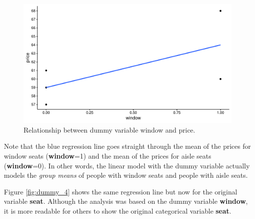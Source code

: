 \documentclass[]{book}\usepackage[]{graphicx}\usepackage[]{color}
\makeatletter
\def\maxwidth{ %
  \ifdim\Gin@nat@width>\linewidth
    \linewidth
  \else
    \Gin@nat@width
  \fi
}
\newenvironment{knitrout}{}{} %
\makeatother
\begin{document}
\begin{knitrout}
\color{fgcolor}\begin{figure}

{\centering \includegraphics[width=\maxwidth]{figure/dummy_3-1} 

}

\caption[Relationship between dummy variable window and price]{Relationship between dummy variable window and price.}\label{fig:dummy_3}
\end{figure}


\end{knitrout}


Note that the blue regression line goes straight through the mean of the prices for window seats (\textbf{window}=1) and the mean of the prices for aisle seats (\textbf{window}=0). In other words, the linear model with the dummy variable actually models the \textit{group means} of people with window seats and people with aisle seats.

Figure \ref{fig:dummy_4} shows the same regression line but now for the original variable \textbf{seat}. Although the analysis was based on the dummy variable \textbf{window}, it is more readable for others to show the original categorical variable \textbf{seat}.
\end{document}
